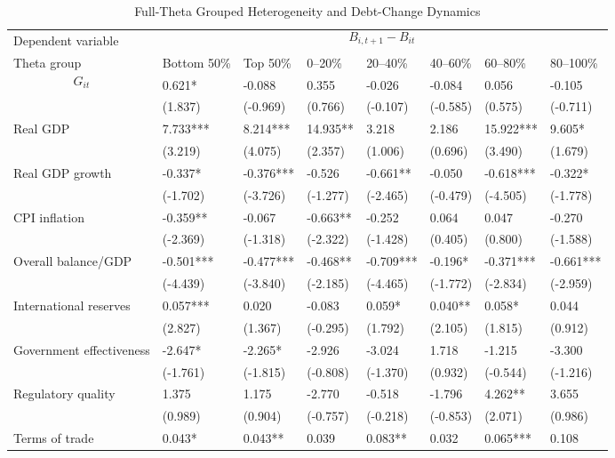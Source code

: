 \begin{table}[H]\centering
\begin{threeparttable}
\caption{Full-Theta Grouped Heterogeneity and Debt-Change Dynamics}
\label{tab:theta_group_heterogeneity_debt}
\scriptsize
\begin{tabularx}{\textwidth}{lYYYYYYY}
\toprule
Dependent variable &  \\
\cmidrule(lr){2-8}
Theta group & Bottom 50\% & Top 50\% & 0--20\% & 20--40\% & 40--60\% & 60--80\% & 80--100\% \\
\midrule
$$G_{it}$$ & 0.621* & -0.088 & 0.355 & -0.026 & -0.084 & 0.056 & -0.105 \\
  & (1.837) & (-0.969) & (0.766) & (-0.107) & (-0.585) & (0.575) & (-0.711) \\
Real GDP & 7.733*** & 8.214*** & 14.935** & 3.218 & 2.186 & 15.922*** & 9.605* \\
  & (3.219) & (4.075) & (2.357) & (1.006) & (0.696) & (3.490) & (1.679) \\
Real GDP growth & -0.337* & -0.376*** & -0.526 & -0.661** & -0.050 & -0.618*** & -0.322* \\
  & (-1.702) & (-3.726) & (-1.277) & (-2.465) & (-0.479) & (-4.505) & (-1.778) \\
CPI inflation & -0.359** & -0.067 & -0.663** & -0.252 & 0.064 & 0.047 & -0.270 \\
  & (-2.369) & (-1.318) & (-2.322) & (-1.428) & (0.405) & (0.800) & (-1.588) \\
Overall balance/GDP & -0.501*** & -0.477*** & -0.468** & -0.709*** & -0.196* & -0.371*** & -0.661*** \\
  & (-4.439) & (-3.840) & (-2.185) & (-4.465) & (-1.772) & (-2.834) & (-2.959) \\
International reserves & 0.057*** & 0.020 & -0.083 & 0.059* & 0.040** & 0.058* & 0.044 \\
  & (2.827) & (1.367) & (-0.295) & (1.792) & (2.105) & (1.815) & (0.912) \\
Government effectiveness & -2.647* & -2.265* & -2.926 & -3.024 & 1.718 & -1.215 & -3.300 \\
  & (-1.761) & (-1.815) & (-0.808) & (-1.370) & (0.932) & (-0.544) & (-1.216) \\
Regulatory quality & 1.375 & 1.175 & -2.770 & -0.518 & -1.796 & 4.262** & 3.655 \\
  & (0.989) & (0.904) & (-0.757) & (-0.218) & (-0.853) & (2.071) & (0.986) \\
Terms of trade & 0.043* & 0.043** & 0.039 & 0.083** & 0.032 & 0.065*** & 0.108 \\

\end{tabularx}
\end{threeparttable}
\end{table}
